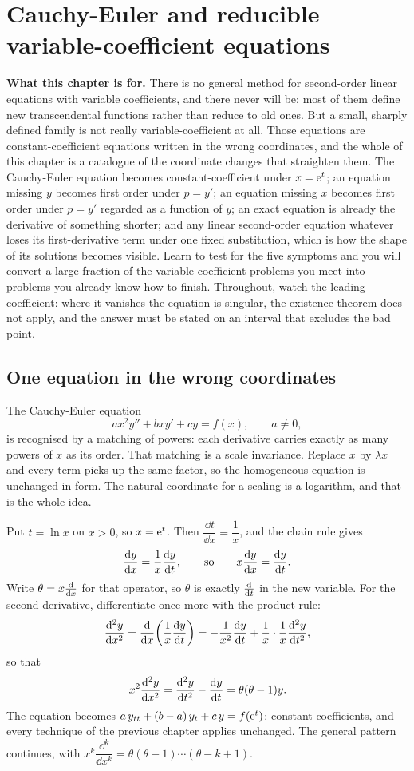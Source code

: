 \chapter{Cauchy-Euler and reducible variable-coefficient equations}

\begin{orient}
\textbf{What this chapter is for.} There is no general method for second-order linear equations with variable coefficients, and there never will be: most of them define new transcendental functions rather than reduce to old ones. But a small, sharply defined family is not really variable-coefficient at all. Those equations are constant-coefficient equations written in the wrong coordinates, and the whole of this chapter is a catalogue of the coordinate changes that straighten them. The Cauchy-Euler equation becomes constant-coefficient under $x=\mathrm{e}^{t}$; an equation missing $y$ becomes first order under $p=y'$; an equation missing $x$ becomes first order under $p=y'$ regarded as a function of $y$; an exact equation is already the derivative of something shorter; and any linear second-order equation whatever loses its first-derivative term under one fixed substitution, which is how the shape of its solutions becomes visible. Learn to test for the five symptoms and you will convert a large fraction of the variable-coefficient problems you meet into problems you already know how to finish. Throughout, watch the leading coefficient: where it vanishes the equation is singular, the existence theorem does not apply, and the answer must be stated on an interval that excludes the bad point.
\end{orient}

\section{One equation in the wrong coordinates}

The Cauchy-Euler equation
\[a x^{2}y''+bxy'+cy=f(x),\qquad a\ne0,\]
is recognised by a matching of powers: each derivative carries exactly as many powers of $x$ as its order. That matching is a scale invariance. Replace $x$ by $\lambda x$ and every term picks up the same factor, so the homogeneous equation is unchanged in form. The natural coordinate for a scaling is a logarithm, and that is the whole idea.

Put $t=\ln x$ on $x>0$, so $x=\mathrm{e}^{t}$. Then $\dfrac{\dd t}{\dd x}=\dfrac1x$, and the chain rule gives
\[\frac{\mathrm{d}y}{\mathrm{d}x}=\frac1x\frac{\mathrm{d}y}{\mathrm{d}t},\qquad\text{so}\qquad x\frac{\mathrm{d}y}{\mathrm{d}x}=\frac{\mathrm{d}y}{\mathrm{d}t}.\]
Write $\theta=x\frac{\mathrm{d}}{\mathrm{d}x}$ for that operator, so $\theta$ is exactly $\frac{\mathrm{d}}{\mathrm{d}t}$ in the new variable. For the second derivative, differentiate once more with the product rule:
\[\frac{\mathrm{d}^{2}y}{\mathrm{d}x^{2}}=\frac{\mathrm{d}}{\mathrm{d}x}\!\left(\frac1x\frac{\mathrm{d}y}{\mathrm{d}t}\right)=-\frac{1}{x^{2}}\frac{\mathrm{d}y}{\mathrm{d}t}+\frac{1}{x}\cdot\frac{1}{x}\frac{\mathrm{d}^{2}y}{\mathrm{d}t^{2}},\]
so that
\[x^{2}\frac{\mathrm{d}^{2}y}{\mathrm{d}x^{2}}=\frac{\mathrm{d}^{2}y}{\mathrm{d}t^{2}}-\frac{\mathrm{d}y}{\mathrm{d}t}=\theta(\theta-1)y.\]
The equation becomes $a\,y_{tt}+(b-a)\,y_{t}+c\,y=f(\mathrm{e}^{t})$: constant coefficients, and every technique of the previous chapter applies unchanged. The general pattern continues, with $x^{k}\dfrac{\dd^{k}}{\dd x^{k}}=\theta(\theta-1)\cdots(\theta-k+1)$.

